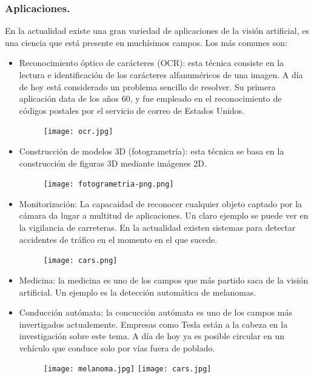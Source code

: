 \documentclass[a4paper,10pt]{article}
\begin{document}
\subsubsection{Aplicaciones.}
En la actualidad existe una gran variedad de aplicaciones de la visión artificial, es una ciencia que está presente en muchísimos campos. Los más comunes son:
\begin{itemize}
\item Reconocimiento óptico de carácteres (OCR): esta técnica consiste en la lectura e identificación de los carácteres alfanuméricos de una imagen. A día de hoy está considerado un problema sencillo de resolver. Su primera aplicación data de los años 60, y fue empleado en el reconocimiento de códigos postales por el servicio de correo de Estados Unidos.
\begin{figure}[H]
\centering
\texttt{[image: ocr.jpg]}
\end{figure}
\item Construcción de modelos 3D (fotogrametría): esta técnica se basa en la construcción de figuras 3D mediante imágenes 2D.
\begin{figure}[H]
\centering
\texttt{[image: fotogrametria-png.png]}
\end{figure}
\item Monitorización: La capacaidad de reconocer cualquier objeto captado por la cámara da lugar a multitud de aplicaciones. Un claro ejemplo se puede ver en la vigilancia de carreteras. En la actualidad existen sistemas para detectar accidentes de tráfico en el momento en el que sucede.
\begin{figure}[H]
\centering
\texttt{[image: cars.png]}
\end{figure}
\item Medicina: la medicina es uno de los campos que más partido saca de la visión artificial. Un ejemplo es la detección automática de melanomas.
\item Conducción autómata: la concucción autómata es uno de los campos más invertigados actualemente. Empresas como Tesla están a la cabeza en la investigación sobre este tema. A día de hoy ya es posible circular en un vehículo que conduce solo por vías fuera de poblado.
\begin{figure}[H]
\centering
\texttt{[image: melanoma.jpg]}\hfill
\texttt{[image: cars.jpg]}
\end{figure}
\end{itemize}
\end{document}
